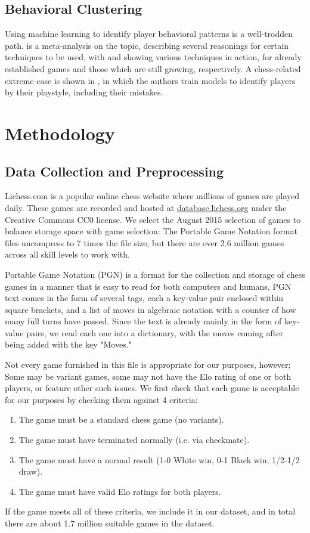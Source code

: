 \documentclass[conference]{IEEEtran}
\begin{document}
\subsection{Behavioral Clustering}
Using machine learning to identify player behavioral patterns is a well-trodden path. \cite{b3} is a meta-analysis on the topic, describing several reasonings for certain techniques to be used, with \cite{b7} and \cite{b8} showing various techniques in action, for already established games and those which are still growing, respectively. A chess-related extreme case is shown in \cite{b10}, in which the authors train models to identify players by their playstyle, including their mistakes.


\section{Methodology}
\subsection{Data Collection and Preprocessing}
Lichess.com is a popular online chess website where millions of games are played daily. These games are recorded and hosted at \href{https://database.lichess.org/}{database.lichess.org} under the Creative Commons CC0 license. We select the August 2015 selection of games to balance storage space with game selection: The Portable Game Notation format files uncompress to 7 times the file size, but there are over 2.6 million games across all skill levels to work with.

Portable Game Notation (PGN) is a format for the collection and storage of chess games in a manner that is easy to read for both computers and humans. \cite{b9} PGN text comes in the form of several tags, each a key-value pair enclosed within square brackets, and a list of moves in algebraic notation with a counter of how many full turns have passed. Since the text is already mainly in the form of key-value pairs, we read each one into a dictionary, with the moves coming after being added with the key "Moves."

Not every game furnished in this file is appropriate for our purposes, however; Some may be variant games, some may not have the Elo rating of one or both players, or feature other such issues. We first check that each game is acceptable for our purposes by checking them against 4 criteria:
\begin{enumerate}
    \item The game must be a standard chess game (no variants).
    \item The game must have terminated normally (i.e. via checkmate).
    \item The game must have a normal result (1-0 White win, 0-1 Black win, 1/2-1/2 draw).
    \item The game must have valid Elo ratings for both players.
\end{enumerate}
If the game meets all of these criteria, we include it in our dataset, and in total there are about 1.7 million suitable games in the dataset.
\end{document}
